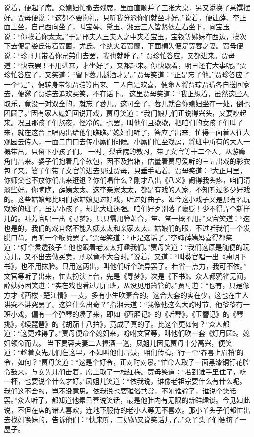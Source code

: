 \documentclass[12pt,oneside]{book}
\begin{document}
说着，便起了席。众媳妇忙撤去残席，里面直顺并了三张大桌，另又添换了果馔摆好。贾母便说：“这都不要拘礼，只听我分派你们就坐才好。”说着，便让薛、李正面上坐，自己西向坐了，叫宝琴、黛玉、湘云三人皆紧依左右坐下，向宝玉说：“你挨着你太太。”于是邢夫人王夫人之中夹着宝玉，宝钗等姊妹在西边，挨次下去便是娄氏带着贾菌，尤氏、李纨夹着贾蘭，下面横头便是贾蓉之妻。贾母便说：“珍哥儿带着你兄弟们去罢，我也就睡了。”
贾珍忙答应，又都进来。贾母道：“快去罢！不用进来，才坐好了，又都起来。你快歇着，明日还有大事呢。”贾珍忙答应了，又笑道：“留下蓉儿斟酒才是。”贾母笑道：“正是忘了他。”贾珍答应了一个“是”，便转身带领贾琏等出来。二人自是欢喜，便命人将贾琮贾璜各自送回家去，便邀了贾琏去追欢买笑，不在话下。
这里贾母笑道：“我正想着，虽然这些人取乐，竟没一对双全的，就忘了蓉儿。这可全了，蓉儿就合你媳妇坐在一处，倒也团圆了。”因有家人媳妇回说开戏，贾母笑道：“我们娘儿们正说得兴头，又要吵起来。况且那孩子们熬夜，怪冷的。也罢，叫他们且歇歇，把咱们的女孩子们叫了来，就在这台上唱两出给他们瞧瞧。”媳妇们听了，答应了出来，忙得一面着人往大观园去传人，一面二门口去传小厮们伺候。小厮们忙至戏房，将班中所有的大人一概带出，只留下小孩子们。
一时，梨香院的教习，带了文官等十二个人，从游廊角门出来。婆子们抱着几个软包，因不及抬箱，估量着贾母爱听的三五出戏的彩衣包了来。婆子们带了文官等进去见过贾母，只垂手站着。贾母笑道：“大正月里，你师父也不放你们出来逛逛？你们唱什么？刚才八出《八义》闹得我头疼，咱们清淡些好。你瞧瞧，薛姨太太、这李亲家太太，都是有戏的人家，不知听过多少好戏的。这些姑娘都比咱们家姑娘见过好戏，听过好曲子。如今这小戏子又是那有名玩戏家的班子，虽是小孩子，却比大班还强。咱们好歹别落了褒贬！少不得弄个新样儿的。叫芳官唱一出《寻梦》，只只需用管萧合，笙、笛一概不用。”文官笑道：“这也是的，我们的戏自然不能入姨太太和亲家太太、姑娘们的眼，不过听我们一个发脱口齿，再听一个喉咙罢了。”贾母笑道：“正是这话了。”李婶薛姨妈喜得都笑道：“好个灵透孩子！他也跟着老太太打趣我们。”贾母笑道：“我们这原是随便的玩意儿，又不出去做买卖，所以竟不大合时。”说着，又道：“叫葵官唱一出《惠明下书》，也不用抹脸。只用这两出，叫他们听个疏异罢了。若省一点力，我可不依。”
文官等听了出来，忙去扮演上台，先是《寻梦》，次是《下书》。众人都鸦雀无闻，薛姨妈因笑道：“实在戏也看过几百班，从没见用箫管的。”贾母道：“也有，只是像方才《西楼·楚江情》一支，多有小生吹萧合的。这合大套的实在少，这也在主人讲究不讲究罢了。这算什么出奇？”指湘云道：“我像他这么大的时节，他爷爷有一班小戏，偏有一个弹琴的凑了来，即如《西厢记》的《听琴》，《玉簪记》的《琴挑》，《续琵琶》的《胡茄十八拍》，竟成了真的了。比这个更如何？”众人都道：“这更难得了。”贾母便命个媳妇来，吩咐文官等，叫他们吹一套《灯月圆》。媳妇领命而去。
当下贾蓉夫妻二人捧酒一巡，凤姐儿因见贾母十分高兴，便笑道：“趁着女先儿们在这里，不如叫他们击鼓，咱们传梅，行一个‘春喜上眉梢’的令，如何？”贾母笑道：“这是个好令，正对时对景。”忙命人取了一面黑漆铜钉花腔令鼓来，与女先儿们击着，席上取了一枝红梅。贾母笑道：“若到谁手里住了，吃一杯，也要说个什么才好。”凤姐儿笑道：“依我说，谁像老祖宗要什么有什么呢。我们这不会的，岂不没意思。依我说也要雅俗共赏，不如谁输了，谁说个笑话罢。”众人听了，都知道他素日善说笑话，最是他肚内有无限的新鲜趣谈。今见如此说，不但在席的诸人喜欢，连地下服侍的老小人等无不喜欢。那小丫头子们都忙出去找姐唤妹的，告诉他们：“快来听，二奶奶又说笑话儿了。”众丫头子们便挤了一屋子。
\end{document}
